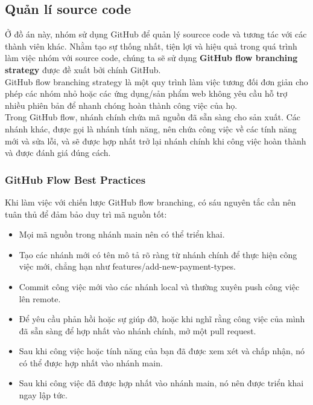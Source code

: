 \subsection{Quản lí source code}

Ở đồ án này, nhóm sử dụng GitHub để quản lý sourcce code và tương tác với các thành viên khác. Nhằm tạo sự thống nhất, tiện lợi và hiệu quả trong quá trình làm việc nhóm với source code, chúng ta sẽ sử dụng \textbf{GitHub flow branching strategy } được đề xuất bởi chính GitHub. \\

GitHub flow branching strategy là một quy trình làm việc tương đối đơn giản cho phép các nhóm nhỏ hoặc các ứng dụng/sản phẩm web không yêu cầu hỗ trợ nhiều phiên bản để nhanh chóng hoàn thành công việc của họ. \\

Trong GitHub flow, nhánh chính chứa mã nguồn đã sẵn sàng cho sản xuất. Các nhánh khác, được gọi là nhánh tính năng, nên chứa công việc về các tính năng mới và sửa lỗi, và sẽ được hợp nhất trở lại nhánh chính khi công việc hoàn thành và được đánh giá đúng cách. 
\subsubsection{GitHub Flow Best Practices}
Khi làm việc với chiến lược GitHub flow branching, có sáu nguyên tắc cần nên tuân thủ để đảm bảo duy trì mã nguồn tốt:
\begin{itemize}
    \item Mọi mã nguồn trong nhánh main nên có thể triển khai.
    \item Tạo các nhánh mới có tên mô tả rõ ràng từ nhánh chính để thực hiện công việc mới, chẳng hạn như features/add-new-payment-types.
    \item Commit công việc mới vào các nhánh local và thường xuyên push công việc lên remote.
    \item Để yêu cầu phản hồi hoặc sự giúp đỡ, hoặc khi nghĩ rằng công việc của mình đã sẵn sàng để hợp nhất vào nhánh chính, mở một pull request.
    \item Sau khi công việc hoặc tính năng của bạn đã được xem xét và chấp nhận, nó có thể được hợp nhất vào nhánh main.
    \item Sau khi công việc đã được hợp nhất vào nhánh main, nó nên được triển khai ngay lập tức.
\end{itemize}

